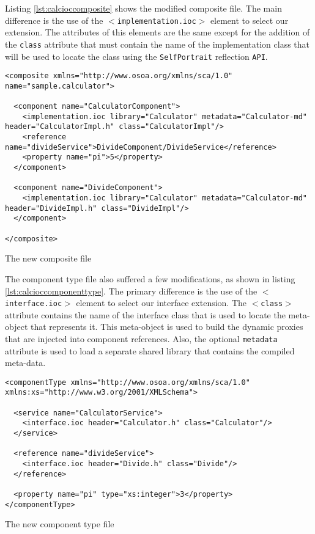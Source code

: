 Listing \ref{lst:calcioccomposite} shows the modified composite file. The main difference
is the use of the \texttt{$<$implementation.ioc$>$} element to select our extension. The attributes
of this elements are the same except for the addition of the \texttt{class} attribute that must
contain the name of the implementation class that will be used to locate the class using the
\texttt{SelfPortrait} reflection \texttt{API}.

\begin{listing}
\begin{verbatim}
<composite xmlns="http://www.osoa.org/xmlns/sca/1.0" name="sample.calculator">

  <component name="CalculatorComponent">
    <implementation.ioc library="Calculator" metadata="Calculator-md" header="CalculatorImpl.h" class="CalculatorImpl"/>
    <reference name="divideService">DivideComponent/DivideService</reference>
    <property name="pi">5</property>
  </component>
        
  <component name="DivideComponent">
    <implementation.ioc library="Calculator" metadata="Calculator-md" header="DivideImpl.h" class="DivideImpl"/>
  </component>

</composite>
\end{verbatim}
\caption{The new composite file}
\label{lst:calcioccomposite}
\end{listing}

The component type file also suffered a few modifications, as shown in listing \ref{lst:calcioccomponenttype}.
The primary difference is the use of the \texttt{$<$interface.ioc$>$} element to select our interface extension.
The \texttt{$<$class$>$} attribute contains the name of the interface class that is used to locate the
meta-object that represents it. This meta-object is used to build the dynamic proxies that are injected into
component references. Also, the optional \texttt{metadata} attribute is used to load a separate shared library
that contains the compiled meta-data.

\begin{listing}
\begin{verbatim}
<componentType xmlns="http://www.osoa.org/xmlns/sca/1.0" xmlns:xs="http://www.w3.org/2001/XMLSchema">

  <service name="CalculatorService">
    <interface.ioc header="Calculator.h" class="Calculator"/>
  </service>

  <reference name="divideService">
    <interface.ioc header="Divide.h" class="Divide"/>
  </reference>
  
  <property name="pi" type="xs:integer">3</property>
</componentType>
\end{verbatim}
\caption{The new component type file}
\label{lst:calcioccomponenttype}
\end{listing}

